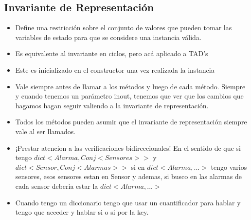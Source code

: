 \documentclass[10pt,a4paper]{article}
\begin{document}
\subsection*{Invariante de Representación}
\begin{itemize}
    \item Define una restricción sobre el conjunto de valores que pueden tomar las variables de estado para que se considere una instancia válida.
    \item Es equivalente al invariante en ciclos, pero acá aplicado a TAD's
    \item Este es inicializado en el constructor una vez realizada la instancia
    \item Vale siempre antes de llamar a los métodos y luego de cada método. Siempre y cuando tenemos un parámetro inout, tenemos que ver que los cambios que hagamos hagan seguir valiendo a la invariante de representación.
    \item Todos los métodos pueden asumir que el invariante de representación siempre vale al ser llamados.
    \item ¡Prestar atencion a las verificaciones bidireccionales! En el sentido de que si tengo \(dict<Alarma, Conj<Sensores>>\) y \(dict<Sensor, Conj<Alarmas>>\) si en \(dict<Alarma, ...>\) tengo varios sensores, esos sensores estan en Sensor y ademas, si busco en las alarmas de cada sensor deberia estar la \(dict<Alarma, ...>\)
    \item Cuando tengo un diccionario tengo que usar un cuantificador para hablar y tengo que acceder y hablar si o si por la key.
\end{itemize}
\end{document}
